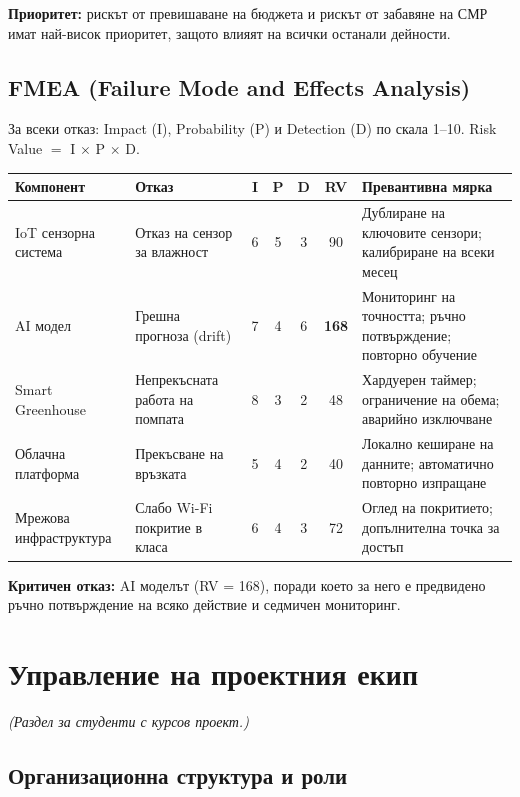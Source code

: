 \documentclass[11pt,a4paper]{article}
\begin{document}
\textbf{Приоритет:} рискът от превишаване на бюджета и рискът от забавяне на СМР имат най-висок приоритет, защото влияят на всички останали дейности.

\subsection{FMEA (Failure Mode and Effects Analysis)}

За всеки отказ: Impact (I), Probability (P) и Detection (D) по скала 1--10. Risk Value $=$ I $\times$ P $\times$ D.

\begin{table}[h]
\centering
\small
\begin{tabularx}{\textwidth}{@{}>{\raggedright\arraybackslash}p{3.4cm}>{\raggedright\arraybackslash}p{3.6cm}cccc>{\raggedright\arraybackslash}X@{}}
\toprule
Компонент & Отказ & I & P & D & RV & Превантивна мярка \\
\midrule
IoT сензорна система & Отказ на сензор за влажност & 6 & 5 & 3 & 90 & Дублиране на ключовите сензори; калибриране на всеки месец \\
AI модел & Грешна прогноза (drift) & 7 & 4 & 6 & \textbf{168} & Мониторинг на точността; ръчно потвърждение; повторно обучение \\
Smart Greenhouse & Непрекъсната работа на помпата & 8 & 3 & 2 & 48 & Хардуерен таймер; ограничение на обема; аварийно изключване \\
Облачна платформа & Прекъсване на връзката & 5 & 4 & 2 & 40 & Локално кеширане на данните; автоматично повторно изпращане \\
Мрежова инфраструктура & Слабо Wi-Fi покритие в класа & 6 & 4 & 3 & 72 & Оглед на покритието; допълнителна точка за достъп \\
\bottomrule
\end{tabularx}
\end{table}

\textbf{Критичен отказ:} AI моделът (RV = 168), поради което за него е предвидено ръчно потвърждение на всяко действие и седмичен мониторинг.

\section{Управление на проектния екип}

\textit{(Раздел за студенти с курсов проект.)}

\subsection{Организационна структура и роли}
\end{document}
